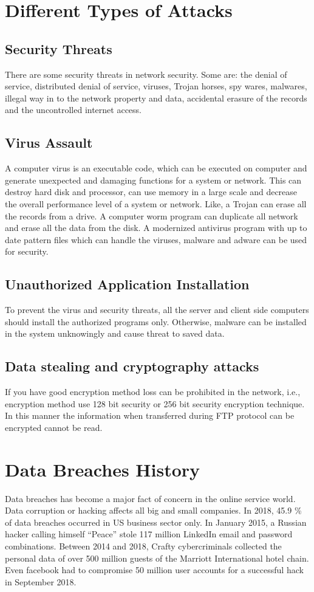 \documentclass[12pt,a4paper,conference]{IEEEtran}
\begin{document}
\section{Different Types of Attacks}


\subsection{Security Threats}
There are some security threats in network security. Some are: the denial of service, distributed denial of service, viruses, Trojan horses, spy wares, malwares, illegal way in to the network property and data, accidental erasure of the records and the uncontrolled internet access.

\subsection{Virus Assault}
A computer virus is an executable code, which can be executed on computer and generate unexpected and damaging functions for a system or network. This can destroy hard disk and processor, can use memory in a large scale and decrease the overall performance level of a system or network. Like, a Trojan can erase all the records from a drive.  A computer worm program can duplicate all network and erase all the data from the disk. A modernized antivirus program with up to date pattern files which can handle the viruses, malware and adware can be used for security. 

\subsection{Unauthorized Application Installation}
To prevent the virus and security threats, all the server and client side computers should install the authorized programs only. Otherwise, malware can be installed in the system unknowingly and cause threat to saved data.

\subsection{Data stealing and cryptography attacks}
If you have good encryption method loss can be prohibited in the network, i.e., encryption method use 128 bit security or 256 bit security encryption technique. In this manner the information when transferred during FTP protocol can be encrypted cannot be read. \autocite{Ramya17}

\section{Data Breaches History}
Data breaches has become a major fact of concern in the online service world. Data corruption or hacking affects all big and small companies. In 2018, 45.9 \%  of data breaches occurred in US business sector only. In January 2015, a Russian hacker calling himself “Peace” stole 117 million LinkedIn email and password combinations. Between 2014 and 2018, Crafty cybercriminals collected the personal data of over 500 million guests of the Marriott International hotel chain. Even facebook had to compromise 50 million user accounts for a successful hack in September 2018. 
\end{document}
